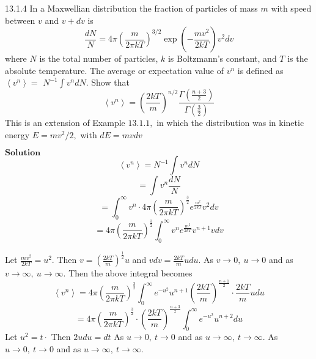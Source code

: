 \newpage

\begin{mybox}{13.1.4}
In a Maxwellian distribution the fraction of particles of mass $m$ with speed between $v$ and $v+d v$ is
$$
\frac{d N}{N}=4 \pi\left(\frac{m}{2 \pi k T}\right)^{3 / 2} \exp \left(-\frac{m v^{2}}{2 k T}\right) v^{2} d v
$$
where $N$ is the total number of particles, $k$ is Boltzmann's constant, and $T$ is the absolute temperature. The average or expectation value of $v^{n}$ is defined as $\left\langle v^{n}\right\rangle=$ $N^{-1} \int v^{n} d N .$ Show that
$$
\left\langle v^{n}\right\rangle=\left(\frac{2 k T}{m}\right)^{n / 2} \frac{\Gamma\left(\frac{n+3}{2}\right)}{\Gamma\left(\frac{3}{2}\right)}
$$
This is an extension of Example $13.1 .1,$ in which the distribution was in kinetic energy $E=m v^{2} / 2,$ with $d E=m v d v$
\end{mybox}
$\boxed{\textbf{Solution}}$ 
$$\left\langle v^{n}\right\rangle=N^{-1} \int v^{n} d N$$
$$=\int v^{n} \frac{d N}{N}$$
$$=\int_{0}^{\infty} v^{n} \cdot 4 \pi\left(\frac{m}{2 \pi k T}\right)^{\frac{3}{2}} e^{\frac{m^{2}}{2 k T}} v^{2} d v$$
$$=4 \pi\left(\frac{m}{2 \pi k T}\right)^{\frac{3}{2}} \int_{0}^{\infty} v^{n} e^{\frac{m^{2}}{2 k T}} v^{n+1} v d v$$

Let $\frac{m v^{2}}{2 k T}=u^{2} .$ Then $v=\left(\frac{2 k T}{m}\right)^{\frac{1}{2}} u$ and $v d v=\frac{2 k T}{m} u d u$. As $v \rightarrow 0, \  u \rightarrow 0$ and as $v \rightarrow \infty, \  u \rightarrow \infty$. Then the above integral becomes
$$
\left\langle v^{n}\right\rangle=4 \pi\left(\frac{m}{2 \pi k T}\right)^{\frac{3}{2}} \int_{0}^{\infty} e^{-u^{2}} u^{n+1}\left(\frac{2 k T}{m}\right)^{\frac{n+1}{2}} \cdot \frac{2 k T}{m} u d u
$$
$$
=4 \pi\left(\frac{m}{2 \pi k T}\right)^{\frac{3}{2}} \cdot\left(\frac{2 k T}{m}\right)^{\frac{n+3}{2}} \int_{0}^{\infty} e^{-u^{2}} u^{n+2} d u
$$
Let $u^{2}=t \cdot$ Then $2 u d u=d t$ As $u \rightarrow 0, \  t \rightarrow 0$ and as $u \rightarrow \infty, \  t \rightarrow \infty$. As $u \rightarrow 0, \  t \rightarrow 0$ and as $u \rightarrow \infty, \  t \rightarrow \infty$.

